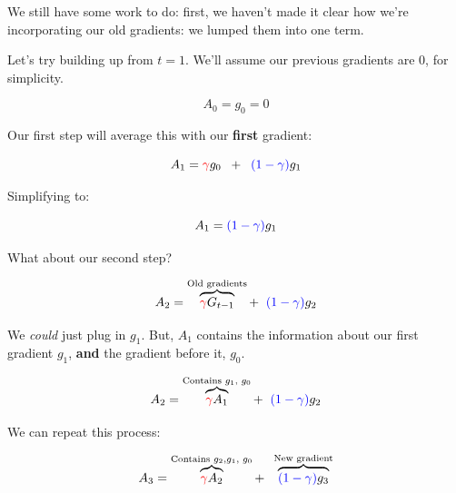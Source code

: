             We still have some work to do: first, we haven't made it clear how we're incorporating our old gradients: we lumped them into one term.
            
            Let's try building up from $t=1$. We'll assume our previous gradients are 0, for simplicity.
            
            \begin{equation}
                A_0=g_0=0
            \end{equation}
            
            Our first step will average this with our \textbf{first} gradient:
            
            \begin{equation}
                A_1 
                =  
                \textcolor{red}{\gamma} g_0 \;\;+\;\; \textcolor{blue}{(1-\gamma)} g_1
            \end{equation}
            
            Simplifying to:
            
            \begin{equation}
                A_1 =  \textcolor{blue}{(1-\gamma)} g_1
            \end{equation}
            
            What about our second step? 
            
            \begin{equation}
                A_2
                =
                \overbrace{
                    \textcolor{red}{\gamma} G_{t-1}
                }^{\text{Old gradients}}
                + \;\;
                \textcolor{blue}{(1-\gamma)} g_2
            \end{equation}
            
            We \textit{could} just plug in $g_1$. But, $A_1$ contains the information about our first gradient $g_1$, \textbf{and} the gradient before it, $g_0$.
            
            \begin{equation}
                A_2
                =
                \overbrace{
                    \textcolor{red}{\gamma} A_1
                }^{\text{Contains $g_1$, $g_0$}}
                + \;\;
                \textcolor{blue}{(1-\gamma)} g_2
            \end{equation}
            
            We can repeat this process:
            
            \begin{equation}
                A_3 = 
                \overbrace{
                    \textcolor{red}{\gamma} A_{2}
                }^{\text{Contains $g_2$,$g_1$, $g_0$}}
                + \;\;
                \overbrace{
                    \textcolor{blue}{(1-\gamma)} g_3
                }^{\text{New gradient}}
            \end{equation}

